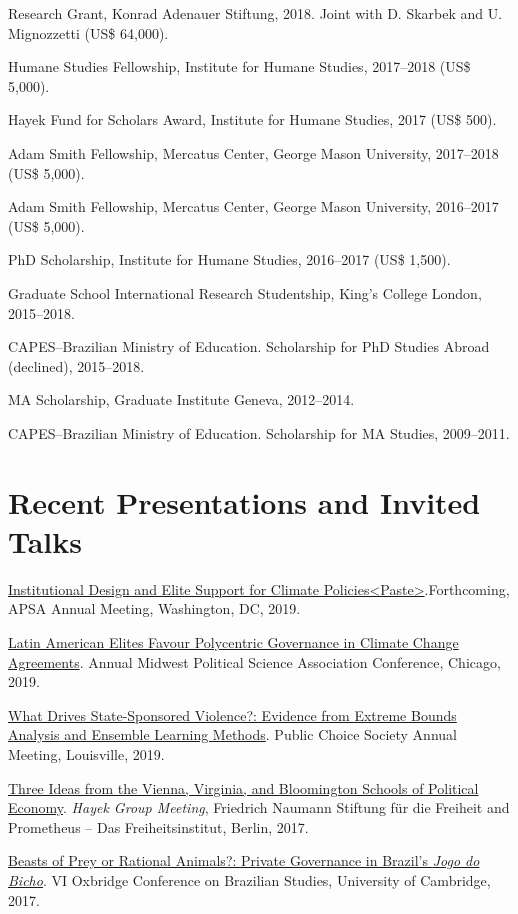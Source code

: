 \documentclass[a4paper]{article}
\renewenvironment{itemize}{
  \begin{list}{}{
    \setlength{\leftmargin}{1.5em}
  }
}{
  \end{list}
}
\begin{document}
\begin{itemize}
    \item Research Grant, Konrad Adenauer Stiftung, 2018. Joint with D. Skarbek and U. Mignozzetti (US\$ 64,000).
	\item Humane Studies Fellowship, Institute for Humane Studies, 2017--2018 (US\$ 5,000).
	\item Hayek Fund for Scholars Award, Institute for Humane Studies, 2017 (US\$ 500).
	\item Adam Smith Fellowship, Mercatus Center, George Mason University, 2017--2018 (US\$ 5,000).
	\item Adam Smith Fellowship, Mercatus Center, George Mason University, 2016--2017 (US\$ 5,000).
	\item PhD Scholarship, Institute for Humane Studies, 2016--2017 (US\$ 1,500).
	\item Graduate School International Research Studentship, King's College London, 2015--2018.
	\item CAPES--Brazilian Ministry of Education. Scholarship for PhD Studies Abroad (declined), 2015--2018.
	\item MA Scholarship, Graduate Institute Geneva, 2012--2014.
	\item CAPES--Brazilian Ministry of Education. Scholarship for MA Studies, 2009--2011.
\end{itemize}

\section*{Recent Presentations and Invited Talks}

\begin{itemize}
    \item \href{https://osf.io/9a6ch}{Institutional Design and Elite Support for Climate Policies<Paste>}.Forthcoming, APSA Annual Meeting, Washington, DC, 2019.
    \item \href{https://osf.io/9a6ch}{Latin American Elites Favour Polycentric Governance in Climate Change Agreements}. Annual Midwest Political Science Association Conference, Chicago, 2019.
    \item \href{http://danilofreire.github.io/pcs-2019}{What Drives State-Sponsored Violence?: Evidence from Extreme Bounds Analysis and Ensemble Learning Methods}. Public Choice Society Annual Meeting, Louisville, 2019.
    \item \href{https://www.overleaf.com/project/591ef5259fb58ede3dc4d369}{Three Ideas from the Vienna, Virginia, and Bloomington Schools of Political Economy}. \textit{Hayek Group Meeting}, Friedrich Naumann Stiftung f{\"u}r die Freiheit and Prometheus -- Das Freiheitsinstitut, Berlin, 2017.
	\item \href{https://osf.io/se2jr}{Beasts of Prey or Rational Animals?: Private Governance in Brazil's \emph{Jogo do Bicho}}. VI Oxbridge Conference on Brazilian Studies, University of Cambridge, 2017.
\end{itemize}
\end{document}
